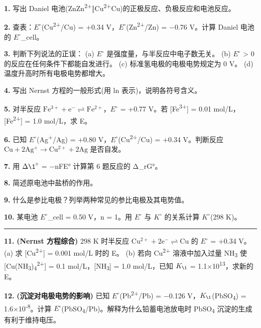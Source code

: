 \textbf{1.} 写出 Daniel 电池(Zn\textbar Zn\textsuperscript{2+}‖Cu\textsuperscript{2+}\textbar Cu)的正极反应、负极反应和电池反应。

\textbf{2.} 查表：\(E^{\circ}\)(Cu\textsuperscript{2+}/Cu) = +0.34 V，\(E^{\circ}\)(Zn\textsuperscript{2+}/Zn) = −0.76 V。计算 Daniel 电池的 \(E^{\circ}\)\_cell。

\textbf{3.} 判断下列说法的正误：
(a) \(E^{\circ}\) 是强度量，与半反应中电子数无关。
(b) \(E^{\circ}\) \textgreater{} 0 的反应在任何条件下都能自发进行。
(c) 标准氢电极的电极电势规定为 0 V。
(d) 温度升高时所有电极电势都增大。

\textbf{4.} 写出 Nernst 方程的一般形式(用 ln 表示)，说明各符号含义。

\textbf{5.} 对半反应 \(\mathrm{Fe^{3+} + e^- \rightleftharpoons Fe^{2+}}\)，\(E^{\circ}\) = +0.77 V。若 {[}Fe\textsuperscript{3+}{]} = 0.01 mol/L，{[}Fe\textsuperscript{2+}{]} = 1.0 mol/L，求 E。

\textbf{6.} 已知 \(E^{\circ}\)(Ag\textsuperscript{+}/Ag) = +0.80 V，\(E^{\circ}\)(Cu\textsuperscript{2+}/Cu) = +0.34 V。判断反应 \(\mathrm{Cu + 2Ag^+ \to Cu^{2+} + 2Ag}\) 是否自发。

\textbf{7.} 用 \(\Delta \1^{\circ}\) = −nFE° 计算第 6 题反应的 Δ\_rG°。

\textbf{8.} 简述原电池中盐桥的作用。

\textbf{9.} 什么是参比电极？列举两种常见的参比电极及其电势值。

\textbf{10.} 某电池 \(E^{\circ}\)\_cell = 0.50 V，n = 1。用 \(E^{\circ}\) 与 \(K^{\circ}\) 的关系计算 \(K^{\circ}\)(298 K)。

\begin{center}\rule{0.5\linewidth}{0.5pt}\end{center}

\textbf{11.} \textbf{(Nernst 方程综合)} 298 K 时半反应 \(\mathrm{Cu^{2+} + 2e^- \rightleftharpoons Cu}\) 的 \(E^{\circ}\) = +0.34 V。
(a) 求 {[}Cu\textsuperscript{2+}{]} = 0.001 mol/L 时的 E。
(b) 若向 Cu\textsuperscript{2+} 溶液中加入过量 NH\textsubscript{3} 使 {[}Cu(NH\textsubscript{3})\textsubscript{4}\textsuperscript{2+}{]} = 0.1 mol/L，{[}NH\textsubscript{3}{]} = 1.0 mol/L，已知 \(K_{\1}\) = 1.1×10\textsuperscript{13}，求新的 E。

\textbf{12.} \textbf{(沉淀对电极电势的影响)} 已知 \(E^{\circ}\)(Pb\textsuperscript{2+}/Pb) = −0.126 V，\(K_{\1}\)(PbSO\textsubscript{4}) = 1.6×10\textsuperscript{-8}。计算 \(E^{\circ}\)(PbSO\textsubscript{4}/Pb)。解释为什么铅蓄电池放电时 PbSO\textsubscript{4} 沉淀的生成有利于维持电压。


